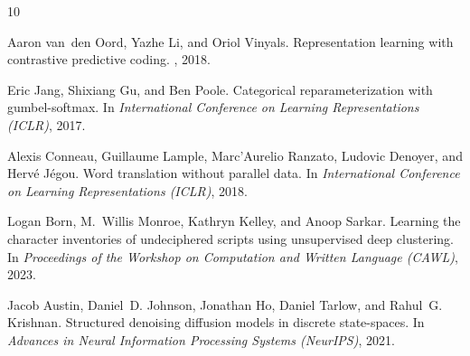 \documentclass[10pt,twocolumn]{article}
\begin{document}

\begin{thebibliography}{10}

Aaron van~den Oord, Yazhe Li, and Oriol Vinyals.
\newblock Representation learning with contrastive predictive coding.
, 2018.

Eric Jang, Shixiang Gu, and Ben Poole.
\newblock Categorical reparameterization with gumbel-softmax.
\newblock In {\em International Conference on Learning Representations (ICLR)}, 2017.

Alexis Conneau, Guillaume Lample, Marc'Aurelio Ranzato, Ludovic Denoyer, and Herv\'e J\'egou.
\newblock Word translation without parallel data.
\newblock In {\em International Conference on Learning Representations (ICLR)}, 2018.

Logan Born, M.~Willis Monroe, Kathryn Kelley, and Anoop Sarkar.
\newblock Learning the character inventories of undeciphered scripts using unsupervised deep clustering.
\newblock In {\em Proceedings of the Workshop on Computation and Written Language (CAWL)}, 2023.

Jacob Austin, Daniel~D. Johnson, Jonathan Ho, Daniel Tarlow, and Rahul~G. Krishnan.
\newblock Structured denoising diffusion models in discrete state-spaces.
\newblock In {\em Advances in Neural Information Processing Systems (NeurIPS)}, 2021.

\end{thebibliography}
\end{document}
